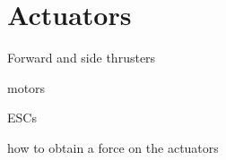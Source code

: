 \section{Actuators}

Forward and side thrusters

motors

ESCs

how to obtain a force on the actuators